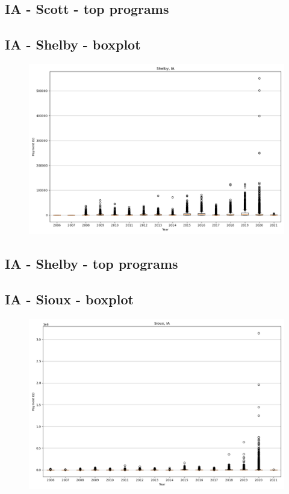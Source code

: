\subsection*{IA - Scott - top programs}

\newpage
\subsection*{IA - Shelby - boxplot}
\begin{figure}[h]
\centering
\includegraphics[width=7in]{../output/boxplots/counties/Shelby-IA_boxplot.png}
\end{figure}


\subsection*{IA - Shelby - top programs}

\newpage
\subsection*{IA - Sioux - boxplot}
\begin{figure}[h]
\centering
\includegraphics[width=7in]{../output/boxplots/counties/Sioux-IA_boxplot.png}
\end{figure}


